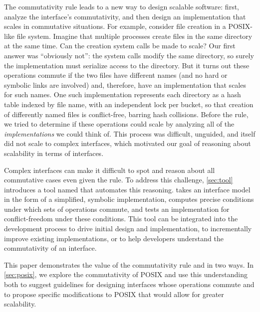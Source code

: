 The commutativity rule leads to a new way to design scalable
software:
%
first, analyze the interface's commutativity, and then design an
implementation that
scales in commutative situations.
%
For example,
consider file creation in a POSIX-like file system. Imagine that
multiple processes create files in the same directory at the same
time. Can the creation system calls be made to scale? Our
first answer was ``obviously not'': the system calls modify the same
directory, so surely the implementation must
serialize access to the directory. But it turns
out these operations commute if the two files have different names
(and no hard or symbolic links are involved) and, therefore, have an
implementation that scales for such names.
One such implementation represents each directory as a hash table
indexed by file name, with an independent lock per bucket,
so that creation of differently named files is conflict-free, barring
hash collisions.
%
Before the rule, we tried to determine if these
operations could scale by analyzing all of the \emph{implementations}
we could think
of.  This process was difficult, unguided, and itself did not scale to
complex interfaces, which
motivated our goal of reasoning about
scalability in terms of interfaces.

Complex interfaces can make it difficult to spot and reason about all
commutative cases even given the rule.  To address this challenge,
\cref{sec:tool} introduces a tool named \tool that automates this
reasoning.  \tool takes an interface model
in the form of a simplified, symbolic implementation, computes precise
conditions under which sets of operations commute, and tests an
implementation for conflict-freedom under these conditions.  This tool can be
integrated into the development process to drive initial design and
implementation, to incrementally improve existing implementations, or to
help developers understand the commutativity of an interface.

This paper demonstrates the value of the commutativity rule and \tool
in two ways.
In \cref{sec:posix}, we explore the commutativity of POSIX
and use this
understanding both to suggest 
guidelines for designing interfaces
whose operations commute and
to propose specific modifications to POSIX
that would allow for greater scalability.

